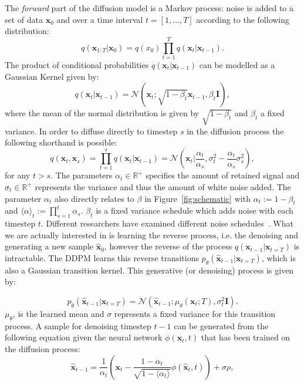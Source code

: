 \documentclass[journal=jacsat,manuscript=article]{achemso}
\begin{document}
The \textit{forward} part of the diffusion model is a Markov process: noise is added to a set of data $\mathbf{x}_0$ and over a time interval $t = [1,\ldots,T]$ according to the following distribution:
\begin{equation}
  q(\mathbf{x}_{1:T}|\mathbf{x}_0) = q(x_0)\prod_{t=1}^T q(\mathbf{x}_t|\mathbf{x}_{t-1}).
  \label{eqn:noising}
\end{equation}
The product of conditional probabilities $q(\mathbf{x}_t | \mathbf{x}_{t-1})$ can be modelled as a Gaussian Kernel given by:
\begin{equation}
q(\mathbf{x}_t | \mathbf{x}_{t-1}) = \mathcal{N}(\mathbf{x}_t;\sqrt{1-\beta_t}\mathbf{x}_{t-1}, \beta_t\mathbf{I}),
\end{equation}
where the mean of the normal distribution is given by $ \sqrt{1-\beta_t}$ and $\beta_t$ a fixed variance. 
In order to diffuse directly to timestep $s$ in the diffusion process the following shorthand is possible:
\begin{equation}
    q(\mathbf{x}_t, \mathbf{x}_s)=\prod_{t=1}^s q(\mathbf{x}_t|\mathbf{x}_{t-1})=\mathcal{N}(\mathbf{x}_t|\frac{\alpha_t}{\alpha_s}, \sigma_t^2-\frac{\alpha_t}{\alpha_s}\sigma^2_s),
\end{equation}
for any $t>s$. The parameters $\alpha_t \in \mathbb{R}^{+}$ specifies the amount of retained signal and $\sigma_t \in \mathbb{R}^{+}$ represents the variance and thus the amount of white noise added. The parameter $\alpha_t$ also directly relates to $\beta$ in Figure~\ref{fig:schematic} with $\alpha_t:=1-\beta_t$ and $\langle\alpha\rangle_t:=\prod_{s=1}^t\alpha_s$. $\beta_t$ is a fixed variance schedule which adds noise with each timestep $t$.
Different researchers have examined different noise schedules~\cite{sohl-dickstein2015deep, ho2020denoising}.
What we are actually interested in is learning the reverse process, i.e. the denoising and generating a new sample $\mathbf{\hat{x}}_0$, however the reverse of the process $q(\mathbf{x}_{t-1}|\mathbf{x}_{t=T})$ is intractable. The DDPM learns this reverse transitions $p_{\theta}(\hat{\mathbf{x}}_{t-1}|\mathbf{x}_{t=T})$, which is also a Gaussian transition kernel. This generative (or denoising) process is given by:

\begin{equation}
p_{\theta}(\hat{\mathbf{x}}_{t-1}|\mathbf{x}_{t=T})=\mathcal{N}(\hat{\mathbf{x}}_{t-1}; \mu_{\theta}(\mathbf{x}_t;T), \sigma_t^2\mathbf{I}).
\label{eqn:denoising}
\end{equation}
$\mu_{\theta}$, is the learned mean and $\sigma$ represents a fixed variance for this transition process.
A sample for denoising timestep $t-1$ can be generated from the following equation given the neural network $\phi(\mathbf{x}_t,t)$ that has been trained on the diffusion process: 
\begin{equation}
 \hat{\mathbf{x}}_{t-1} = \frac{1}{\alpha_t}(\mathbf{x}_t-\frac{1-\alpha_t}{\sqrt{1-\langle\alpha_t\rangle}}\phi(\mathbf{\hat{x}}_t,t)) +\sigma \rho,   
\end{equation}
\end{document}
